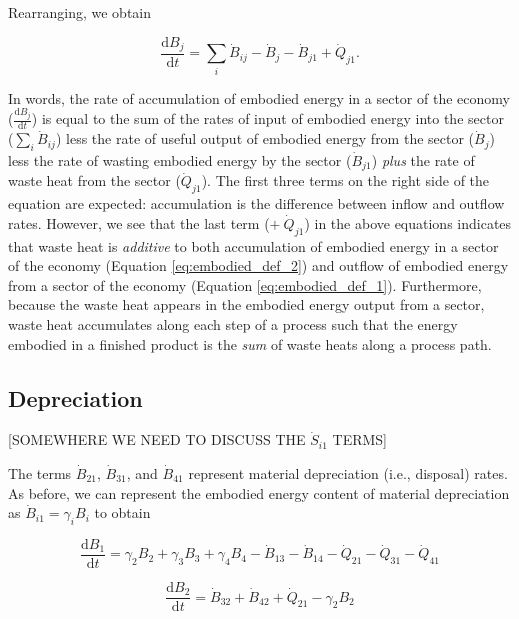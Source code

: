 \documentclass[authoryear,preprint,review,12pt]{elsarticle}
\begin{document}
Rearranging, we obtain

\begin{equation} \label{eq:embodied_def_2}
	\frac{\mathrm{d}B_{j}}{\mathrm{d}t} =  \displaystyle\sum_{i} \dot{B}_{ij} - \dot{B}_{j} - \dot{B}_{j1} + \dot{Q}_{j1}.
\end{equation}

In words, the rate of accumulation of embodied energy in a sector of the economy ($\frac{\mathrm{d}B_{j}}{\mathrm{d}t}$) is equal to the sum of the rates of input of embodied energy into the sector ($\displaystyle\sum_{i} \dot{B}_{ij}$) less the rate of useful output of embodied energy from the sector ($\dot{B}_{j}$) less  the rate of wasting embodied energy by the sector ($\dot{B}_{j1}$) \emph{plus} the rate of waste heat from the sector ($\dot{Q}_{j1}$). The first three terms on the right side of the equation are expected: accumulation is the difference between inflow and outflow rates. However, we see that the last term ($+\ \dot{Q}_{j1}$) in the above equations indicates that waste heat is \emph{additive} to both accumulation of embodied energy in a sector of the economy (Equation \ref{eq:embodied_def_2}) and outflow of embodied energy from a sector of the economy (Equation \ref{eq:embodied_def_1}). Furthermore, because the waste heat appears in the embodied energy output from a sector, waste heat accumulates along each step of a process such that the energy embodied in a finished product is the \emph{sum} of waste heats along a process path.


 \subsection{Depreciation}

[SOMEWHERE WE NEED TO DISCUSS THE $\dot{S}_{i1}$ TERMS]

The terms $\dot{B}_{21}$,  $\dot{B}_{31}$, and $\dot{B}_{41}$ represent material depreciation (i.e., disposal) rates. As before, we can represent the embodied energy content of material depreciation as $\dot{B}_{i1} = \gamma_i B_i$ to obtain

\begin{equation} \label{eq:C-embodied_acct_1_depreciation}
	\frac{\mathrm{d}B_{1}}{\mathrm{d}t} 	 = \gamma_2 B_2 + \gamma_3 B_3 + \gamma_4 B_4 - \dot{B}_{13} - \dot{B}_{14} - \dot{Q}_{21} - \dot{Q}_{31} - \dot{Q}_{41}
\end{equation}

\begin{equation} \label{eq:C-embodied_acct_2_depreciation}
	\frac{\mathrm{d}B_{2}}{\mathrm{d}t} 	 = \dot{B}_{32} + \dot{B}_{42} + \dot{Q}_{21} - \gamma_2 B_2
\end{equation}
\end{document}
